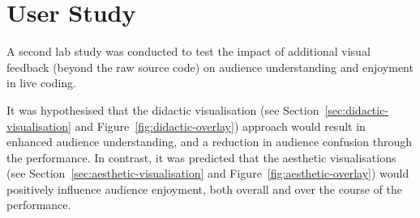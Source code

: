 
\chapter{User Study}
\label{chap:user-study}

A second lab study was conducted to test the impact of additional visual feedback (beyond the raw source code) on audience understanding and enjoyment in live coding.

It was hypothesised that the didactic visualisation (see Section~\ref{sec:didactic-visualisation} and Figure~\ref{fig:didactic-overlay}) approach would result in enhanced audience understanding, and a reduction in audience confusion through the performance. In contrast, it was predicted that the aesthetic visualisations (see Section~\ref{sec:aesthetic-visualisation} and Figure~\ref{fig:aesthetic-overlay}) would positively influence audience enjoyment, both overall and over the course of the performance. 


